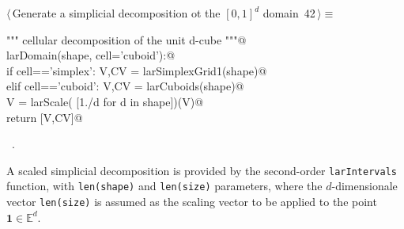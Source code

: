 \documentclass[11pt,oneside]{article}    %
\def\E{\mathbb{E}}
\begin{document}
\begin{flushleft} \small \label{scrap69}
\protect{}$\langle\,$Generate a simplicial decomposition ot the $[0,1]^d$ domain\nobreak\ {\footnotesize 42}$\,\rangle\equiv$
\vspace{-1ex}
\begin{list}{}{} \item
\mbox{}\verb@""" cellular decomposition of the unit d-cube """@\\
\mbox{}\verb@def larDomain(shape, cell='cuboid'):@\\
\mbox{}\verb@    if cell=='simplex': V,CV = larSimplexGrid1(shape)@\\
\mbox{}\verb@    elif cell=='cuboid': V,CV = larCuboids(shape)@\\
\mbox{}\verb@    V = larScale( [1./d for d in shape])(V)@\\
\mbox{}\verb@    return [V,CV]@\\
\mbox{}\verb@@{\NWsep}
\end{list}
\vspace{-1ex}
\footnotesize\addtolength{\baselineskip}{-1ex}
\begin{list}{}{\setlength{\itemsep}{-\parsep}\setlength{\itemindent}{-\leftmargin}}
\item \NWtxtMacroRefIn\ .
\end{list}
\end{flushleft}

A scaled simplicial decomposition is provided by the second-order  \texttt{larIntervals} function, with \texttt{len(shape)} and \texttt{len(size)} parameters, where the $d$-dimensionale vector \texttt{len(size)} is assumed as the scaling vector to be applied to the point $\mathbf{1}\in\E^d$.
\end{document}
